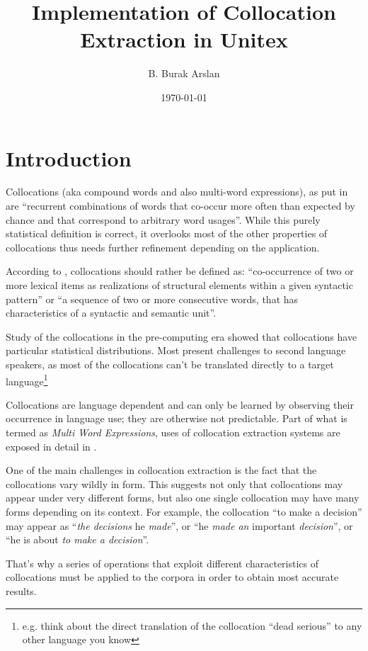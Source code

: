 \documentclass[a4paper,12pt,oneside]{article}
\title{Implementation of Collocation Extraction in Unitex}
\author{B. Burak Arslan}
\date{\today}
\begin{document}
\maketitle
\section{Introduction}
Collocations (aka compound words and also multi-word expressions), as put
in\cite{smadja93} are ``recurrent combinations of words that co-occur more often
than expected by chance and that correspond to arbitrary word usages''. While
this purely statistical definition is correct, it overlooks most of the other
properties of collocations thus needs further refinement depending on the
application.

According to \cite{SeretanWehrli2006ACL}, collocations should rather be defined
as: ``co-occurrence of two or more lexical items as realizations of structural
elements within a given syntactic pattern'' or ``a sequence of two or more
consecutive words, that has characteristics of a syntactic and semantic unit''.

Study of the collocations in the pre-computing era showed that collocations have
particular statistical distributions. Most present challenges to second language
speakers, as most of the collocations can't be translated directly to a target
language\footnote{e.g. think about the direct translation of the collocation
``dead serious'' to any other language you know}

Collocations are language dependent and can only be learned by observing their
occurrence in language use; they are otherwise not
predictable\cite{seretan2003}. Part of what is termed as \emph{Multi Word
Expressions}, uses of collocation extraction systems are exposed in detail in
\cite{sag02multiword}.

One of the main challenges in collocation extraction is the fact that the
collocations vary wildly in form. This suggests not only that collocations may
appear under very different forms, but also one single collocation may have many
forms depending on its context. For example, the collocation ``to make a
decision'' may appear as ``\textit{the decisions} he \textit{made}'', or ``he
\textit{made an} important \textit{decision}'', or ``he is about \textit{to make
a decision}''.

That's why a series of operations that exploit different characteristics of
collocations must be applied to the corpora in order to obtain most accurate
results.
\end{document}
